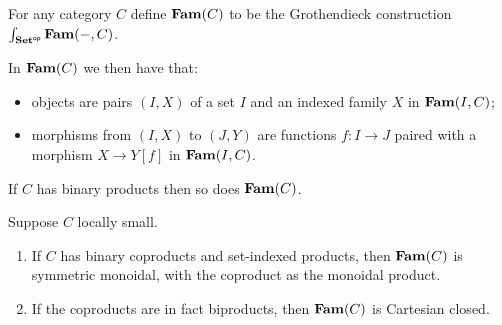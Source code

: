 \begin{definition}
For any category $C$ define $\mathbf{Fam}(C)$ to be the Grothendieck construction
$\int_{\mathbf{Set}^{\mathsf{op}}}\mathbf{Fam}(-,C)$.
\end{definition}

In $\mathbf{Fam}(C)$ we then have that:
\begin{itemize}
\item objects are pairs $(I, X)$ of a set $I$ and an indexed family $X$ in $\mathbf{Fam}(I,C)$;
\item morphisms from $(I, X)$ to $(J, Y)$ are functions $f: I \to J$ paired with a morphism $X \to Y[f]$ in
$\mathbf{Fam}(I,C)$.
\end{itemize}

\begin{proposition}
If $C$ has binary products then so does $\mathbf{Fam}(C)$.
\end{proposition}

\begin{proposition}
Suppose $C$ locally small.
\begin{enumerate}
\item If $C$ has binary coproducts and set-indexed products, then $\mathbf{Fam}(C)$ is symmetric monoidal, with the
coproduct as the monoidal product.
\item If the coproducts are in fact biproducts, then $\mathbf{Fam}(C)$ is Cartesian closed.
\end{enumerate}
\end{proposition}

